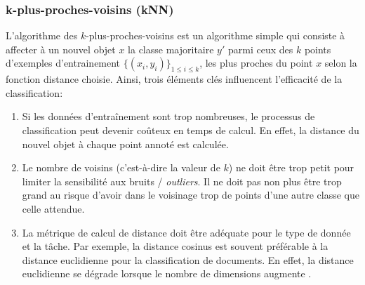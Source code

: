 \subsubsection{k-plus-proches-voisins (kNN)}
L'algorithme des $k$-plus-proches-voisins \citep{cover1967knn} est un algorithme simple qui consiste à affecter à un nouvel objet $x$ la classe majoritaire $y'$ parmi ceux des $k$ points d'exemples d'entrainement $\lbrace (x_i,y_i) \rbrace_{1\leq i \leq k}$, les plus proches du point $x$ selon la fonction distance choisie. Ainsi, trois éléments clés influencent l'efficacité de la classification:
\begin{enumerate}
	\item Si les données d'entraînement sont trop nombreuses, le processus de classification peut devenir coûteux en temps de calcul. En effet, la distance du nouvel objet à chaque point annoté est calculée.
	\item Le nombre de voisins (c'est-à-dire la valeur de $k$) ne doit être trop petit pour limiter la sensibilité aux bruits / \textit{outliers}. Il ne doit pas non plus être trop grand au risque d'avoir dans le voisinage trop de points d'une autre classe que celle attendue. 
	
	
	 
	\item La métrique de calcul de distance doit être adéquate pour le type de donnée et la tâche. Par exemple, la distance cosinus est souvent préférable à la distance euclidienne pour la classification de documents. En effet, la distance euclidienne se dégrade lorsque le nombre de dimensions augmente \citep{sohangir2017improvedCosSim, aggarwal2001behaviorOfDistHighDim}.
\end{enumerate}

